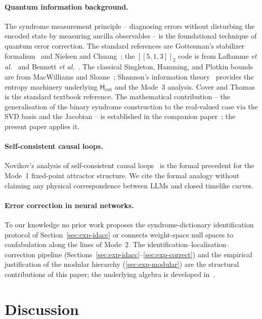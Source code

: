 \documentclass[11pt,a4paper]{article}
\newcommand{\Ccode}[3]{[\![#1,#2,#3]\!]}
\newcommand{\Hout}{\mathsf{H}_{\mathrm{out}}}
\begin{document}
\paragraph{Quantum information background.} The syndrome measurement principle -- diagnosing errors without disturbing the encoded state by measuring ancilla observables -- is the foundational technique of quantum error correction. The standard references are Gottesman's stabilizer formalism~\cite{Gottesman1997} and Nielsen and Chuang~\cite{NielsenChuang2000}; the $\Ccode{5}{1}{3}_2$ code is from Laflamme \textit{et al.}~\cite{Laflamme1996} and Bennett \textit{et al.}~\cite{Bennett1996}. The classical Singleton, Hamming, and Plotkin bounds are from MacWilliams and Sloane~\cite{MacWilliams1977}; Shannon's information theory~\cite{Shannon1948} provides the entropy machinery underlying $\Hout$ and the Mode~3 analysis. Cover and Thomas~\cite{CoverThomas2006} is the standard textbook reference. The mathematical contribution -- the generalisation of the binary syndrome construction to the real-valued case via the SVD basis and the Jacobian -- is established in the companion paper~\cite{SyndromeAlgebra}; the present paper applies it.

\paragraph{Self-consistent causal loops.} Novikov's analysis of self-consistent causal loops~\cite{Novikov1989} is the formal precedent for the Mode~1 fixed-point attractor structure. We cite the formal analogy without claiming any physical correspondence between LLMs and closed timelike curves.

\paragraph{Error correction in neural networks.} To our knowledge no prior work proposes the syndrome-dictionary identification protocol of Section~\ref{sec:exp-idacc} or connects weight-space null spaces to confabulation along the lines of Mode~2. The identification--localisation--correction pipeline (Sections~\ref{sec:exp-idacc}--\ref{sec:exp-correct}) and the empirical justification of the modular hierarchy (\ref{sec:exp-modular}) are the structural contributions of this paper; the underlying algebra is developed in~\cite{SyndromeAlgebra}.


\section{Discussion}
\label{sec:discussion}
\end{document}
